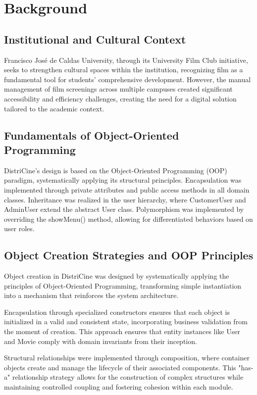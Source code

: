 \documentclass[12pt]{article}
\begin{document}
\section{Background}

\subsection{Institutional and Cultural Context}
Francisco José de Caldas University, through its University Film Club initiative, seeks to strengthen cultural spaces within the institution, recognizing film as a fundamental tool for students' comprehensive development. However, the manual management of film screenings across multiple campuses created significant accessibility and efficiency challenges, creating the need for a digital solution tailored to the academic context.

\subsection{Fundamentals of Object-Oriented Programming}
DistriCine's design is based on the Object-Oriented Programming (OOP) paradigm, systematically applying its structural principles. Encapsulation was implemented through private attributes and public access methods in all domain classes. Inheritance was realized in the user hierarchy, where CustomerUser and AdminUser extend the abstract User class. Polymorphism was implemented by overriding the showMenu() method, allowing for differentiated behaviors based on user roles.

\subsection{Object Creation Strategies and OOP Principles}
Object creation in DistriCine was designed by systematically applying the principles of Object-Oriented Programming, transforming simple instantiation into a mechanism that reinforces the system architecture.

Encapsulation through specialized constructors ensures that each object is initialized in a valid and consistent state, incorporating business validation from the moment of creation. This approach ensures that entity instances like User and Movie comply with domain invariants from their inception.

Structural relationships were implemented through composition, where container objects create and manage the lifecycle of their associated components. This "has-a" relationship strategy allows for the construction of complex structures while maintaining controlled coupling and fostering cohesion within each module.
\end{document}
